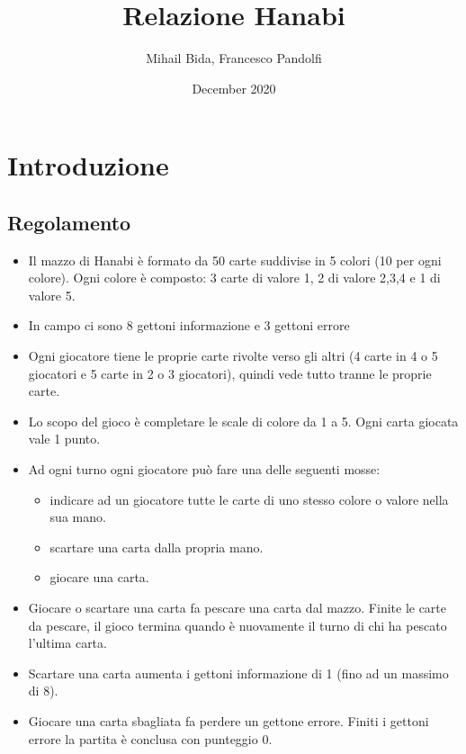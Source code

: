 \documentclass{article}
\title{Relazione Hanabi}
\author{Mihail Bida, Francesco Pandolfi }
\date{December 2020}
\begin{document}
\maketitle

\section{Introduzione}
\subsection{Regolamento}
\begin{itemize}
    \item Il mazzo di Hanabi è formato da 50 carte suddivise in 5 colori (10 per ogni colore). Ogni colore è composto: 3 carte di valore 1, 2 di valore 2,3,4 e 1 di valore 5.
    \item In campo ci sono 8 gettoni informazione e 3 gettoni errore
    \item Ogni giocatore tiene le proprie carte rivolte verso gli altri (4 carte in 4 o 5 giocatori e 5 carte in 2 o 3 giocatori), quindi vede tutto tranne le proprie carte.
    \item Lo scopo del gioco è completare le scale di colore da 1 a 5. Ogni carta giocata vale 1 punto.
    \item 
    {Ad ogni turno ogni giocatore può fare una delle seguenti mosse:
    \begin{itemize}
        \item indicare ad un giocatore tutte le carte di uno stesso colore o valore nella sua mano.
        \item scartare una carta dalla propria mano.
        \item giocare una carta.
    \end{itemize}}
    \item Giocare o scartare una carta fa pescare una carta dal mazzo. Finite le carte da pescare, il gioco termina quando è nuovamente il turno di chi ha pescato l’ultima carta.
    \item Scartare una carta aumenta i gettoni informazione di 1 (fino ad un massimo di 8).
    \item Giocare una carta sbagliata fa perdere un gettone errore. Finiti i gettoni errore la partita è conclusa con punteggio 0.
\end{itemize}
\end{document}
